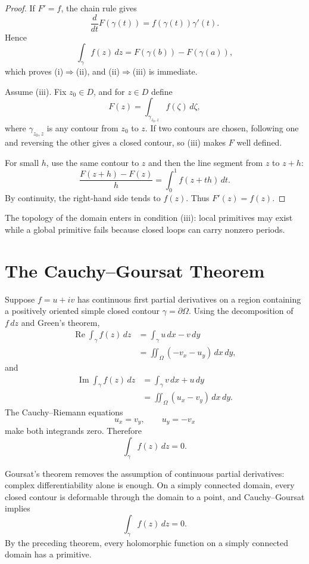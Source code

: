\begin{proof}
If \(F'=f\), the chain rule gives
\[
  \frac{d}{dt}F(\gamma(t))
  =f(\gamma(t))\gamma'(t).
\]
Hence
\[
  \int_\gamma f(z)\,dz
  =F(\gamma(b))-F(\gamma(a)),
\]
which proves (i)\(\Rightarrow\)(ii), and (ii)\(\Rightarrow\)(iii) is immediate.

Assume (iii).  Fix \(z_0\in D\), and for \(z\in D\) define
\[
  F(z)=\int_{\gamma_{z_0,z}}f(\zeta)\,d\zeta,
\]
where \(\gamma_{z_0,z}\) is any contour from \(z_0\) to \(z\).  If two contours are chosen, following one and reversing the other gives a closed contour, so (iii) makes \(F\) well defined.

For small \(h\), use the same contour to \(z\) and then the line segment from \(z\) to \(z+h\):
\[
  \frac{F(z+h)-F(z)}{h}
  =\int_0^1 f(z+th)\,dt.
\]
By continuity, the right-hand side tends to \(f(z)\).  Thus \(F'(z)=f(z)\).
\end{proof}

The topology of the domain enters in condition (iii): local primitives may exist while a global primitive fails because closed loops can carry nonzero periods.

\section{The Cauchy--Goursat Theorem}

Suppose \(f=u+iv\) has continuous first partial derivatives on a region containing a positively oriented simple closed contour \(\gamma=\partial\Omega\).  Using the decomposition of \(f\,dz\) and Green's theorem,
\[
\begin{aligned}
  \operatorname{Re}\int_\gamma f(z)\,dz
  &=\int_\gamma u\,dx-v\,dy\\
  &=\iint_\Omega(-v_x-u_y)\,dx\,dy,
\end{aligned}
\]
and
\[
\begin{aligned}
  \operatorname{Im}\int_\gamma f(z)\,dz
  &=\int_\gamma v\,dx+u\,dy\\
  &=\iint_\Omega(u_x-v_y)\,dx\,dy.
\end{aligned}
\]
The Cauchy--Riemann equations
\[
  u_x=v_y,
  \qquad
  u_y=-v_x
\]
make both integrands zero.  Therefore
\[
  \int_\gamma f(z)\,dz=0.
\]

Goursat's theorem removes the assumption of continuous partial derivatives: complex differentiability alone is enough.  On a simply connected domain, every closed contour is deformable through the domain to a point, and Cauchy--Goursat implies
\[
  \int_\gamma f(z)\,dz=0.
\]
By the preceding theorem, every holomorphic function on a simply connected domain has a primitive.

